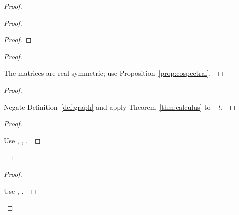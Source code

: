 \documentclass[11pt]{amsart}
\let\qed\relax
\theoremstyle{definition}
\begin{document}
\begin{proof}
\begin{proof}
\begin{proof}
\end{proof}
\begin{proof}
\pf\ \raggedright The matrices are real symmetric; use Proposition~\ref{prop:cospectral}.~\qed
\end{proof}
\begin{proof}
\pf\ \raggedright Negate Definition~\ref{def:graph} and apply Theorem~\ref{thm:calculus} to $-t$.~\qed
\end{proof}
\qedstep
\begin{proof}
\pf\ \raggedright Use , , .~\qed
\end{proof}
\end{proof}
\qedstep
\begin{proof}
\pf\ \raggedright Use , .~\qed
\end{proof}
\end{proof}
\end{document}
